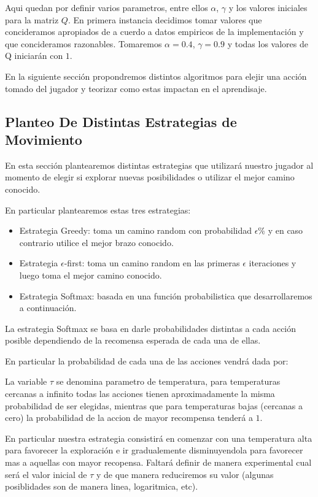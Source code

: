 Aqui quedan por definir varios parametros, entre ellos $\alpha$, $\gamma$ y los valores iniciales para la matriz $Q$. En primera instancia decidimos tomar valores que concideramos apropiados de a cuerdo a datos empiricos de la implementación y que concideramos razonables. Tomaremos $\alpha=0.4 $, $\gamma=0.9$ y todas los valores de Q iniciarán con $1$.

En la siguiente sección propondremos distintos algoritmos para elejir una acción tomado del jugador y teorizar como estas impactan en el aprendisaje.

\subsection{Planteo De Distintas Estrategias de Movimiento}

En esta sección plantearemos distintas estrategias que utilizará nuestro jugador al momento de elegir si explorar nuevas posibilidades o utilizar el mejor camino conocido.

En particular plantearemos estas tres estrategias:


\begin{itemize}
\item Estrategia Greedy: toma un camino random con probabilidad $\epsilon\%$ y en caso contrario utilice el mejor brazo conocido.
\item Estrategia $\epsilon$-first: toma un camino random en las primeras $\epsilon$ iteraciones y luego toma el mejor camino conocido.
\item Estrategia Softmax: basada en una función probabilistica que desarrollaremos a continuación.
\end{itemize}

La estrategia Softmax se basa en darle probabilidades distintas a cada acción posible dependiendo de la recomensa esperada de cada una de ellas.

En particular la probabilidad de cada una de las acciones vendrá dada por:


 La variable $\tau$ se denomina parametro de temperatura, para temperaturas cercanas a infinito todas las acciones tienen aproximadamente la misma probabilidad de ser elegidas, mientras que para temperaturas bajas (cercanas a cero) la probabilidad de la accion de mayor recompensa tenderá a $1$.

En particular nuestra estrategia consistirá en comenzar con una temperatura alta para favorecer la exploración e ir gradualemente disminuyendola para favorecer mas a aquellas con mayor recopensa. Faltará definir de manera experimental cual será el valor inicial de $\tau$ y de que manera reduciremos su valor (algunas posiblidades son de manera linea, logaritmica, etc).

